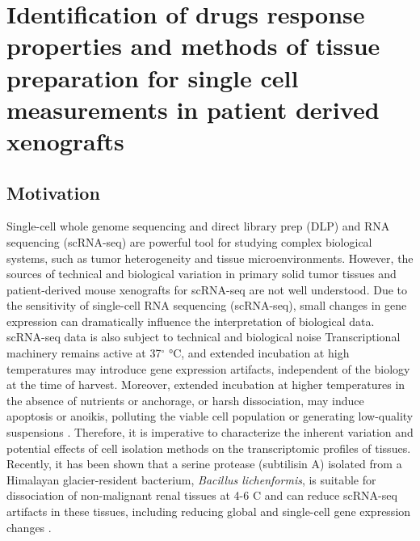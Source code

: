 \chapter{Identification of drugs response properties and methods of tissue preparation for single cell measurements in patient derived xenografts %
}
\label{ch:Chapter 3}

\section{Motivation}
Single-cell whole genome sequencing and direct library prep (DLP) and RNA sequencing (scRNA-seq) are powerful tool for studying complex biological systems, such as tumor heterogeneity and tissue microenvironments. However, the sources of technical and biological variation in primary solid tumor tissues and patient-derived mouse xenografts for scRNA-seq are not well understood.
Due to the sensitivity of single-cell RNA sequencing (scRNA-seq), small changes in gene expression can dramatically influence the interpretation of biological data. scRNA-seq data is also subject to technical and biological noise \cite{potter2018single, stegle2015computational} Transcriptional machinery remains active at 37$^{\circ}$ °C, and extended incubation at high temperatures may introduce gene expression artifacts, independent of the biology at the time of harvest. Moreover, extended incubation at higher temperatures in the absence of nutrients or anchorage, or harsh dissociation, may induce apoptosis or anoikis, polluting the viable cell population or generating low-quality suspensions \cite{volovitz2016non}. Therefore, it is imperative to characterize the inherent variation and potential effects of cell isolation methods on the transcriptomic profiles of tissues. Recently, it has been shown that a serine protease (subtilisin A) isolated from a Himalayan glacier-resident bacterium, \textit{Bacillus lichenformis}, is suitable for dissociation of non-malignant renal tissues at 4-6 \textdegree C and can reduce scRNA-seq artifacts in these tissues, including reducing global and single-cell gene expression changes \cite{shah2012clonal}.

